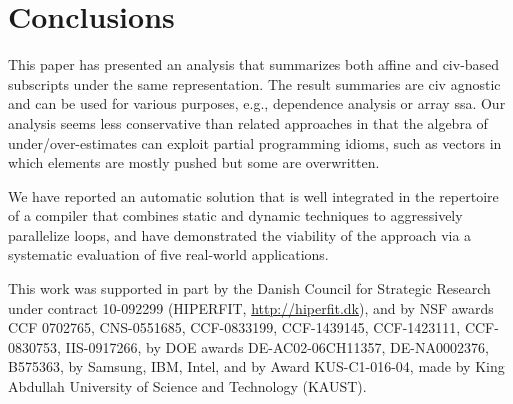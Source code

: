 \documentclass[10pt,nocopyrightspace]{sigplanconf}
\begin{document}

\section{Conclusions}
\label{sec:Concl}

This paper has presented an analysis that summarizes both 
affine and {\sc civ}-based subscripts under the same 
representation. 
%
The result summaries are {\sc civ} agnostic and can be used for 
various  purposes, e.g., dependence analysis or array {\sc ssa}. 
%
Our analysis seems less conservative than related approaches 
in that the algebra of under/over-estimates can exploit partial 
programming idioms, such as vectors in which elements are mostly 
pushed but some are overwritten. 

We have reported an automatic solution that is well integrated 
in the repertoire of a compiler that combines static and dynamic 
techniques to aggressively parallelize loops, and have 
demonstrated the viability of the approach via a systematic
evaluation of five real-world applications.

   

\acks 
   
This work was supported in part by
the Danish Council for Strategic Research under contract 10-092299 (HIPERFIT, \url{http://hiperfit.dk}), 
and by 
NSF awards
CCF 0702765, %
CNS-0551685, %
CCF-0833199, %
CCF-1439145, %
CCF-1423111, %
CCF-0830753, %
IIS-0917266, %
by DOE awards
DE-AC02-06CH11357, %
DE-NA0002376, %
B575363,  %
by Samsung, IBM, Intel, and
by Award KUS-C1-016-04, made by King Abdullah University of Science and Technology (KAUST).







\end{document}
